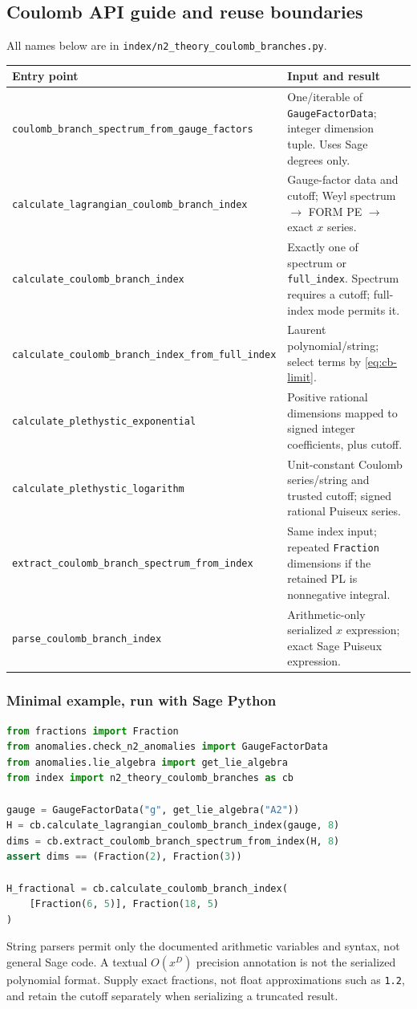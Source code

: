 \documentclass[11pt,a4paper]{article}
\numberwithin{equation}{section}
\newcommand{\code}[1]{{\small\nolinkurl{#1}}}
\begin{document}
\subsection{Coulomb API guide and reuse boundaries}
All names below are in \code{index/n2_theory_coulomb_branches.py}.
\begin{tabularx}{\textwidth}{@{}Yp{65mm}@{}}
\toprule Entry point & Input and result\\\midrule
\code{coulomb_branch_spectrum_from_gauge_factors} & One/iterable of
\code{GaugeFactorData}; integer dimension tuple. Uses Sage degrees only.\\
\code{calculate_lagrangian_coulomb_branch_index} & Gauge-factor data and cutoff;
Weyl spectrum $\to$ FORM PE $\to$ exact $x$ series.\\
\code{calculate_coulomb_branch_index} & Exactly one of spectrum or
\code{full_index}. Spectrum requires a cutoff; full-index mode permits it.\\
\code{calculate_coulomb_branch_index_from_full_index} & Laurent polynomial/string;
select terms by \eqref{eq:cb-limit}.\\
\code{calculate_plethystic_exponential} & Positive rational dimensions mapped to
signed integer coefficients, plus cutoff.\\
\code{calculate_plethystic_logarithm} & Unit-constant Coulomb series/string and
trusted cutoff; signed rational Puiseux series.\\
\code{extract_coulomb_branch_spectrum_from_index} & Same index input; repeated
\code{Fraction} dimensions if the retained PL is nonnegative integral.\\
\code{parse_coulomb_branch_index} & Arithmetic-only serialized $x$ expression;
exact Sage Puiseux expression.\\\bottomrule
\end{tabularx}

\subsubsection{Minimal example, run with Sage Python}
\begin{lstlisting}[language=Python]
from fractions import Fraction
from anomalies.check_n2_anomalies import GaugeFactorData
from anomalies.lie_algebra import get_lie_algebra
from index import n2_theory_coulomb_branches as cb

gauge = GaugeFactorData("g", get_lie_algebra("A2"))
H = cb.calculate_lagrangian_coulomb_branch_index(gauge, 8)
dims = cb.extract_coulomb_branch_spectrum_from_index(H, 8)
assert dims == (Fraction(2), Fraction(3))

H_fractional = cb.calculate_coulomb_branch_index(
    [Fraction(6, 5)], Fraction(18, 5)
)
\end{lstlisting}
String parsers permit only the documented arithmetic variables and syntax, not
general Sage code. A textual $O(x^D)$ precision annotation is not the serialized
polynomial format. Supply exact fractions, not float approximations such as
\code{1.2}, and retain the cutoff separately when serializing a truncated result.
\end{document}
